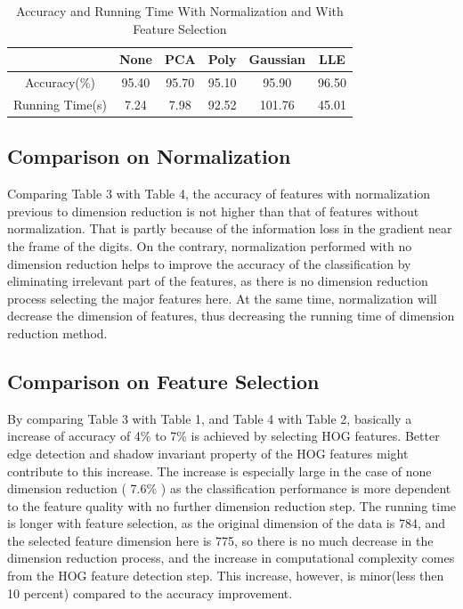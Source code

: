 \documentclass[12pt]{article}
\begin{document}
\begin{table}[h!]
\centering
\caption{Accuracy and Running Time With Normalization and With Feature Selection}
\label{tab:res}
\begin{tabular}{cccccc}
\hline
& \textbf{None} & \textbf{PCA} & \textbf{Poly} & \textbf{Gaussian} & \textbf{LLE} \\
 \hline
Accuracy(\%)               &   95.40     &   95.70 &95.10 &95.90 &96.50  \\
\hline
Running Time(s)    & 7.24       &  7.98       & 92.52 &101.76 &45.01\\
\hline
\end{tabular}
\end{table}
\subsection{Comparison on Normalization}
Comparing Table 3 with Table 4, the accuracy of features with normalization previous to dimension reduction is not higher than that of features without normalization. That is partly because of the information loss in the gradient near the frame of the digits. On the contrary, normalization performed with no dimension reduction helps to improve the accuracy of the classification by eliminating irrelevant part of the features, as there is no dimension reduction process selecting the major features here.
At the same time, normalization will decrease the dimension of features, thus decreasing the running time of dimension reduction method.
\subsection{Comparison on Feature Selection}
By comparing Table 3 with Table 1, and Table 4 with Table 2, basically a increase of accuracy of 4\% to 7\% is achieved by selecting HOG features. Better edge detection and shadow invariant property of the HOG features might contribute to this increase. The increase is especially large in the case of none dimension reduction ( 7.6\% ) as the classification performance is more dependent to the feature quality with no further dimension reduction step.
The running time is longer with feature selection, as the original dimension of the data is 784, and the selected feature dimension here is 775, so there is no much decrease in the dimension reduction process, and the increase in computational complexity comes from the HOG feature detection step. This increase, however, is minor(less then 10 percent) compared to the accuracy improvement.
\end{document}
